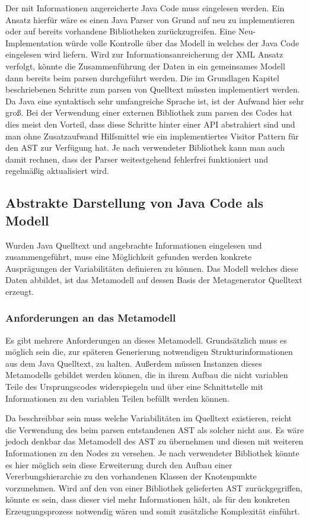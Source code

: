 \documentclass[12pt,oneside,a4paper,parskip]{scrbook}
\begin{document}
Der mit Informationen angereicherte Java Code muss eingelesen werden. Ein Ansatz hierfür wäre es einen Java Parser von Grund auf neu zu implementieren oder auf bereits vorhandene Bibliotheken zurückzugreifen. Eine Neu-Implementation würde volle Kontrolle über das Modell in welches der Java Code eingelesen wird liefern. Wird zur Informationsanreicherung der XML Ansatz verfolgt, könnte die Zusammenführung der Daten in ein gemeinsames Modell dann bereits beim parsen durchgeführt werden. Die im Grundlagen Kapitel beschriebenen Schritte zum parsen von Quelltext müssten implementiert werden. Da Java eine syntaktisch sehr umfangreiche Sprache ist, ist der Aufwand hier sehr groß.  Bei der Verwendung einer externen Bibliothek zum parsen des Codes hat dies meist den Vorteil, dass diese Schritte hinter einer API abstrahiert sind und man ohne Zusatzaufwand Hilfsmittel wie ein implementiertes Visitor Pattern für den AST zur Verfügung hat. Je nach verwendeter Bibliothek kann man auch damit rechnen, dass der Parser weitestgehend fehlerfrei funktioniert und regelmäßig aktualisiert wird.

\subsection{Abstrakte Darstellung von Java Code als Modell}

Wurden Java Quelltext und angebrachte Informationen eingelesen und zusammengeführt, muss eine Möglichkeit gefunden werden konkrete Ausprägungen der Variabilitäten definieren zu können. Das Modell welches diese Daten abbildet, ist das Metamodell auf dessen Basis der Metagenerator Quelltext erzeugt.

\subsubsection{Anforderungen an das Metamodell}

Es gibt mehrere Anforderungen an dieses Metamodell. Grundsätzlich muss es möglich sein die, zur späteren Generierung notwendigen Strukturinformationen aus dem Java Quelltext, zu halten. Außerdem müssen Instanzen dieses Metamodells gebildet werden können, die in ihrem Aufbau die nicht variablen Teile des Ursprungscodes widerspiegeln und über eine Schnittstelle mit Informationen zu den variablen Teilen befüllt werden können.

Da beschreibbar sein muss welche Variabilitäten im Quelltext existieren, reicht die Verwendung des beim parsen entstandenen AST als solcher nicht aus. Es wäre jedoch denkbar das Metamodell des AST zu übernehmen und diesen mit weiteren Informationen zu den Nodes zu versehen. Je nach verwendeter Bibliothek könnte es hier möglich sein diese Erweiterung durch den Aufbau einer Vererbungshierarchie zu den vorhandenen Klassen der Knotenpunkte vorzunehmen. Wird auf den von einer Bibliothek gelieferten AST zurückgegriffen, könnte es sein, dass dieser viel mehr Informationen hält, als für den konkreten Erzeugungsprozess notwendig wären und somit zusätzliche Komplexität einführt.
\end{document}
